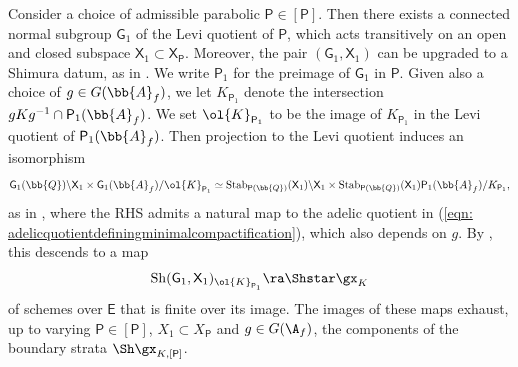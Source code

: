 \documentclass[letterpaper,11pt]{amsart}
\begin{document}
Consider a choice of admissible parabolic $\mathsf{P} \in [\mathsf{P}]$. Then there exists a connected normal subgroup $\mathsf{G}_{1}$ of the Levi quotient of $\mathsf{P}$, which acts transitively on an open and closed subspace $\mathsf{X}_{1}\subset \mathsf{X}_{\mathsf{P}}$. Moreover, the pair $(\mathsf{G}_{1},\mathsf{X}_{1})$ can be upgraded to a Shimura datum, as in \cite[Section~3.6]{PinkHigherDirectImages}. We write $\mathsf{P}_1$ for the preimage of $\mathsf{G}_{1}$ in $\mathsf{P}$. Given also a choice of $g\in G(\bb{A}_f)$, we let $K_{\mathsf{P}_1}$ denote the intersection $gKg^{-1} \cap \mathsf{P}_1(\bb{A}_{f})$. We set $\ol{K}_{\mathsf{P}_1}$ to be the image of $K_{\mathsf{P}_1}$ in the Levi quotient of $\mathsf{P}_1(\bb{A}_f)$. Then projection to the Levi quotient induces an isomorphism
\[ \mathsf{G}_{1}(\bb{Q})\backslash \mathsf{X}_{1} \times \mathsf{G}_{1}(\bb{A}_{f})/\ol{K}_{\mathsf{P}_1} \simeq \mathrm{Stab}_{\mathsf{P}(\bb{Q})}(\mathsf{X}_{1})\backslash \mathsf{X}_{1} \times \mathrm{Stab}_{\mathsf{P}(\bb{Q})}(\mathsf{X}_{1})\mathsf{P}_1(\bb{A}_{f})/K_{\mathsf{P}_1}, \]
as in \cite[Equation~3.7.1]{PinkHigherDirectImages}, where the RHS admits a natural map to the adelic quotient in (\ref{eqn: adelicquotientdefiningminimalcompactification}), which also depends on $g$. By \cite[Theorem~3.7.2]{PinkHigherDirectImages}, this descends to a map 
\begin{equation}{\label{eqn: finitemap}}
\mathrm{Sh}(\mathsf{G}_{1},\mathsf{X}_{1})_{\ol{K}_{\mathsf{P}_1}} \ra \Shstar\gx_{K} 
\end{equation}
of schemes over $\mathsf E$ that is finite over its image. The images of these maps exhaust, up to varying $\mathsf{P} \in [\mathsf{P}]$, $X_1\subset X_{\mathsf{P}}$ and $g\in G(\A_f)$, the components of the boundary strata $\Sh\gx_{K,[\mathsf{P}]}$. 
\end{document}
